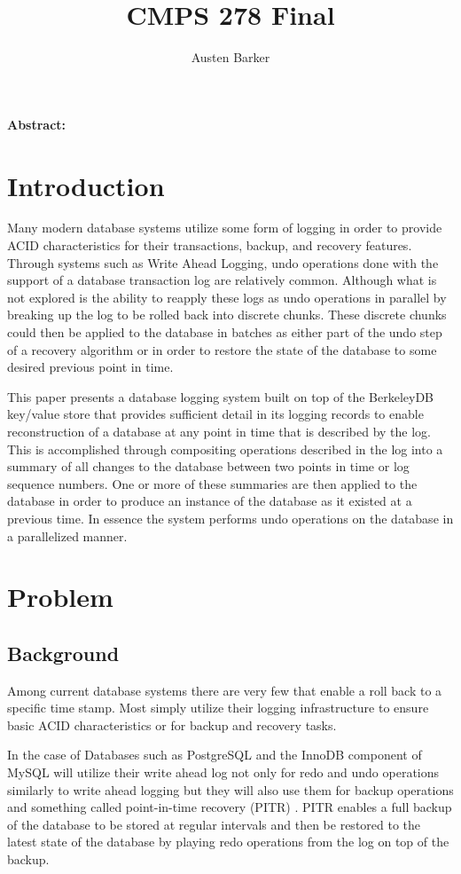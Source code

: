 \documentclass{article}
\begin{document}
\title{CMPS 278 Final}
\author{Austen Barker}
\maketitle


\textbf{Abstract:} 
\section{Introduction}
Many modern database systems utilize some form of logging in order to provide ACID characteristics for their transactions, backup, and recovery features. Through systems such as Write Ahead Logging, undo operations done with the support of a database transaction log are relatively common\cite{WAL}. Although what is not explored is the ability to reapply these logs as undo operations in parallel by breaking up the log to be rolled back into discrete chunks. These discrete chunks could then be applied to the database in batches as either part of the undo step of a recovery algorithm or in order to restore the state of the database to some desired previous point in time.

This paper presents a database logging system built on top of the BerkeleyDB key/value store that provides sufficient detail in its logging records to enable reconstruction of a database at any point in time that is described by the log. This is accomplished through compositing operations described in the log into a summary of all changes to the database between two points in time or log sequence numbers. One or more of these summaries are then applied to the database in order to produce an instance of the database as it existed at a previous time. In essence the system performs undo operations on the database in a parallelized manner.
\section{Problem}

\subsection{Background} 
Among current database systems there are very few that enable a roll back to a specific time stamp. Most simply utilize their logging infrastructure to ensure basic ACID characteristics or for backup and recovery tasks.

In the case of Databases such as PostgreSQL and the InnoDB component of MySQL will utilize their write ahead log not only for redo and undo operations similarly to write ahead logging but they will also use them for backup operations and something called point-in-time recovery (PITR)\cite{InnoDBpoint} \cite{Postgrespoint}. PITR enables a full backup of the database to be stored at regular intervals and then be restored to the latest state of the database by playing redo operations from the log on top of the backup.
\end{document}
